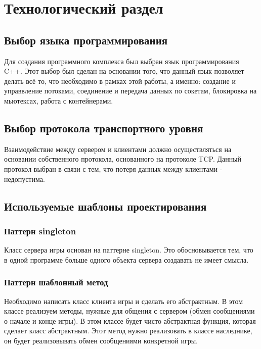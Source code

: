 \chapter{Технологический раздел}

\section{Выбор языка программирования}
Для создания программного комплекса был выбран язык программирования C++. Этот выбор был сделан на основании того, что данный язык позволяет делать всё то, что необходимо в рамках этой работы, а именно: создание и управвление потоками, соединение и передача данных по сокетам, блокировка на мьютексах, работа с контейнерами.

\section{Выбор протокола транспортного уровня}
Взаимодействие между сервером и клиентами должно осуществляться на основании собственного протокола, основанного на протоколе TCP. Данный протокол выбран в связи с тем, что потеря данных между клиентами - недопустима.


\section{Используемые шаблоны проектирования}

\subsection{Паттерн singleton}

Класс сервера игры основан на паттерне singleton. Это обосновывается тем, что в одной программе больше одного объекта сервера создавать не имеет смысла.






\subsection{Паттерн шаблонный метод}

Необходимо написать класс клиента игры и сделать его абстрактным. В этом классе реализуем методы, нужные для общения с сервером (обмен сообщениями о начале и конце игры). В этом классе будет чисто абстрактная функция, которая сделает класс абстрактным. Этот метод нужно реализовать в классе наследнике, он будет реализовывать обмен сообщениями конкретной игры.

